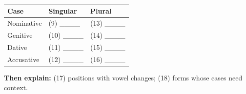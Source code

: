 \begin{minipage}{\linewidth}
\par\begingroup
\fontsize{10.5}{13.2}\selectfont
\setlength{\LTleft}{0pt}\setlength{\LTright}{\fill}
\noindent
\begin{tabular}{@{}>{\raggedright\arraybackslash}p{39.46mm}>{\raggedright\arraybackslash}p{39.46mm}>{\raggedright\arraybackslash}p{39.46mm}@{}}
\toprule
\textbf{Case} & \textbf{Singular} & \textbf{Plural} \\
\midrule
Nominative & (9) \_\_\_\_ & (13) \_\_\_\_ \\
Genitive & (10) \_\_\_\_ & (14) \_\_\_\_ \\
Dative & (11) \_\_\_\_ & (15) \_\_\_\_ \\
Accusative & (12) \_\_\_\_ & (16) \_\_\_\_ \\
\bottomrule
\end{tabular}
\par\endgroup

\textbf{Then explain:} (17) positions with vowel changes; (18) forms whose cases need context.

\end{minipage}\par\addvspace{4pt}

